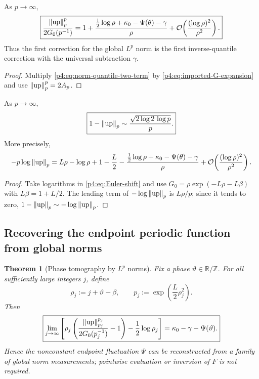 \documentclass[11pt,oneside]{article}
\newtheorem{theorem}{Theorem}[section]
\theoremstyle{definition}
\theoremstyle{remark}
\newcommand{\R}{\mathbb R}
\newcommand{\Z}{\mathbb Z}
\newcommand{\Up}{\operatorname{up}}
\newcommand{\bigO}{\mathcal O}
\begin{document}
\begin{corollary}
\label{p4:cor:Euler-shift}
As $p\to\infty$,
\begin{equation}
 \boxed{
 \frac{\norm{\Up}_p^p}{2G_0(p^{-1})}
 =1+\frac{\frac12\log\rho+\kappa_0-\Psi(\theta)-\gamma}{\rho}
 +\bigO\!\left(\frac{(\log\rho)^2}{\rho^2}\right).}
 \label{p4:eq:Euler-shift}
\end{equation}
Thus the first correction for the global $L^p$ norm is the first inverse-quantile correction
with the universal subtraction $\gamma$.
\end{corollary}

\begin{proof}
Multiply \eqref{p4:eq:norm-quantile-two-term} by
\eqref{p4:eq:imported-G-expansion} and use $\norm{\Up}_p^p=2A_p$.
\end{proof}

\begin{corollary}
\label{p4:cor:norm-deficit}
As $p\to\infty$,
\begin{equation}
 \boxed{
 1-\norm{\Up}_p
 \sim\frac{\sqrt{2\log2\,\log p}}{p}.}
 \label{p4:eq:norm-deficit}
\end{equation}
More precisely,
\begin{equation}
 -p\log\norm{\Up}_p
 =L\rho-\log\rho+1-\frac L2
 -\frac{\frac12\log\rho+\kappa_0-\Psi(\theta)-\gamma}{\rho}
 +\bigO\!\left(\frac{(\log\rho)^2}{\rho^2}\right).
 \label{p4:eq:log-norm-refined}
\end{equation}
\end{corollary}

\begin{proof}
Take logarithms in \eqref{p4:eq:Euler-shift} and use
$G_0=\rho\exp(-L\rho-L\beta)$ with $L\beta=1+L/2$.  The leading term of
$-\log\norm{\Up}_p$ is $L\rho/p$; since it tends to zero,
$1-\norm{\Up}_p\sim-\log\norm{\Up}_p$.
\end{proof}

\subsection{Recovering the endpoint periodic function from global norms}

\begin{theorem}[Phase tomography by $L^p$ norms]
\label{p4:thm:phase-tomography}
Fix a phase $\vartheta\in\R/\Z$.  For all sufficiently large integers $j$, define
\begin{equation}
 \rho_j:=j+\vartheta-\beta,
 \qquad
 p_j:=\exp\!\left(\frac L2\rho_j^2\right).
 \label{p4:eq:phase-locked-p}
\end{equation}
Then
\begin{equation}
 \boxed{
 \lim_{j\to\infty}
 \left[
 \rho_j\left(
 \frac{\norm{\Up}_{p_j}^{p_j}}{2G_0(p_j^{-1})}-1
 \right)-\frac12\log\rho_j
 \right]
 =\kappa_0-\gamma-\Psi(\vartheta).}
 \label{p4:eq:phase-tomography-limit}
\end{equation}
Hence the nonconstant endpoint fluctuation $\Psi$ can be reconstructed from a family of
\emph{global norm measurements}; pointwise evaluation or inversion of $F$ is not required.
\end{theorem}
\end{document}
